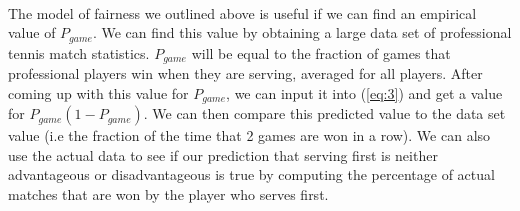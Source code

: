 \documentclass[12pt]{article}
\begin{document}
\paragraph{} The model of fairness we outlined above is useful if we can find an empirical value of $P_{game}$. We can find this value by obtaining a large data set of professional tennis match statistics. $P_{game}$ will be equal to the fraction of games that professional players win when they are serving, averaged for all players. After coming up with this value for $P_{game}$, we can input it into (\ref{eq:3}) and get a value for $P_{game}(1-P_{game})$. We can then compare this predicted value to the data set value (i.e the fraction of the time that 2 games are won in a row). We can also use the actual data to see if our prediction that serving first is neither advantageous or disadvantageous is true by computing the percentage of actual matches that are won by the player who serves first. 



\end{document}

